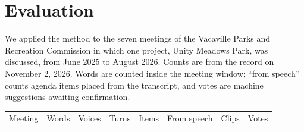 \documentclass[
  american,
  letterpaper,
  11pt]{article}
\begin{document}
\section{Evaluation}\label{evaluation}

We applied the method to the seven meetings of the Vacaville Parks and Recreation Commission in which one project, Unity Meadows Park, was discussed, from June 2025 to August 2026.
Counts are from the record on November 2, 2026.
Words are counted inside the meeting window; ``from speech'' counts agenda items placed from the transcript, and votes are machine suggestions awaiting confirmation.

{\def\LTcaptype{} %
\begin{longtable}[]{@{}
  >{\raggedright\arraybackslash}p{}
  >{\raggedleft\arraybackslash}p{}
  >{\raggedleft\arraybackslash}p{}
  >{\raggedleft\arraybackslash}p{}
  >{\raggedleft\arraybackslash}p{}
  >{\raggedleft\arraybackslash}p{}
  >{\raggedleft\arraybackslash}p{}
  >{\raggedleft\arraybackslash}p{}@{}}
\toprule\noalign{}
\begin{minipage}[b]{\linewidth}\raggedright
Meeting
\end{minipage} & \begin{minipage}[b]{\linewidth}\raggedleft
Words
\end{minipage} & \begin{minipage}[b]{\linewidth}\raggedleft
Voices
\end{minipage} & \begin{minipage}[b]{\linewidth}\raggedleft
Turns
\end{minipage} & \begin{minipage}[b]{\linewidth}\raggedleft
Items
\end{minipage} & \begin{minipage}[b]{\linewidth}\raggedleft
From speech
\end{minipage} & \begin{minipage}[b]{\linewidth}\raggedleft
Clips
\end{minipage} & \begin{minipage}[b]{\linewidth}\raggedleft
Votes
\end{minipage} \\

\end{longtable}}
\end{document}
